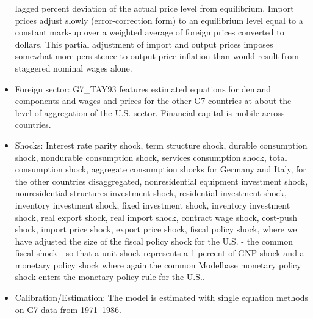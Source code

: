 \documentclass[11pt,a4paper]{article}
\begin{document}
\begin{itemize}
		lagged percent deviation of the actual price level from equilibrium. Import prices adjust slowly (error-correction form) to an equilibrium level equal to a constant mark-up over a weighted average of foreign prices converted to dollars. This partial adjustment of import and output prices imposes somewhat more persistence to output price inflation than would result from staggered nominal wages alone.
		\item Foreign sector: G7\_TAY93 features estimated equations for demand components and wages and prices for the other G7 countries at about the level of aggregation of the U.S. sector. Financial capital is mobile across countries.
		\item Shocks: Interest rate parity shock, term structure shock, durable consumption shock, nondurable consumption shock, services consumption shock, total consumption shock, aggregate consumption shocks for Germany and Italy, for the other countries disaggregated, nonresidential equipment investment shock, nonresidential structures investment shock, residential investment shock, inventory investment shock, fixed investment shock, inventory investment shock, real export shock, real import shock, contract wage shock, cost-push shock, import price shock, export price shock, fiscal policy shock, where we have adjusted the size of the fiscal policy shock for the U.S. - the common fiscal shock - so that a unit shock represents a 1 percent of GNP shock and a monetary policy shock where again the common Modelbase monetary policy shock enters the monetary policy rule for the U.S..
		\item Calibration/Estimation: The model is estimated with single equation methods on G7 data from 1971--1986.
		
		

\end{itemize}
\end{document}
